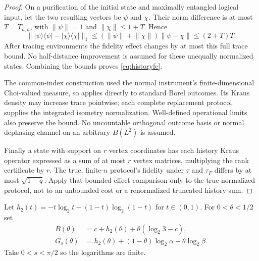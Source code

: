 \documentclass[11pt]{article}
\newcommand{\ket}[1]{\lvert #1\rangle}
\newcommand{\bra}[1]{\langle #1\rvert}
\newcommand{\norm}[1]{\lVert #1\rVert}
\begin{document}
\begin{proof}
On a purification of the initial state and maximally entangled logical input, let the two resulting vectors be $\psi$ and $\chi$. Their norm difference is at most $T=T_{n,h}$, with $\norm\psi=1$ and $\norm\chi\le1+T$. Hence
\[
 \norm{\ket\psi\bra\psi-\ket\chi\bra\chi}_1
 \le(\norm\psi+\norm\chi)\norm{\psi-\chi}\le(2+T)T.
\]
After tracing environments the fidelity effect changes by at most this full trace bound. No half-distance improvement is assumed for these unequally normalized states. Combining the bounds proves \eqref{eq:historyfe}.

The common-index construction used the normal instrument's finite-dimensional Choi-valued measure, so applies directly to standard Borel outcomes. Its Kraus density may increase trace pointwise; each complete replacement protocol supplies the integrated isometry normalization. Well-defined operational limits also preserve the bound. No uncountable orthogonal outcome basis or normal dephasing channel on an arbitrary $B(L^2)$ is assumed.

Finally a state with support on $r$ vertex coordinates has each history Kraus operator expressed as a sum of at most $r$ vertex matrices, multiplying the rank certificate by $r$. The true, finite-$n$ protocol's fidelity under $\tau$ and $\tau_F$ differs by at most $\sqrt{1-q}$. Apply that bounded-effect comparison only to the true normalized protocol, not to an unbounded cost or a renormalized truncated history sum.
\end{proof}

Let $h_2(t)=-t\log_2t-(1-t)\log_2(1-t)$ for $t\in(0,1)$. For $0<\theta<1/2$ set
\begin{align}
 B(\theta)&=c+h_2(\theta)+\theta(\log_2 3-c),\label{eq:Btheta}\\
 G_s(\theta)&=h_2(\theta)+(1-\theta)\log_2\alpha+
                  \theta\log_2\beta.\label{eq:Gtheta}
\end{align}
Take $0<s<\pi/2$ so the logarithms are finite.
\end{document}
